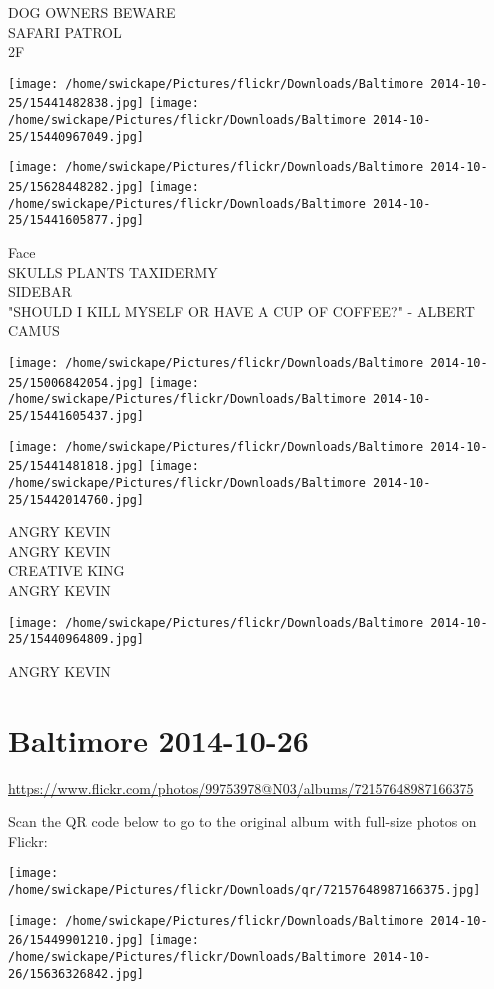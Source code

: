\documentclass[10pt,letterpaper]{article}
\begin{document}
DOG OWNERS BEWARE\\
SAFARI PATROL\\
2F
\pagebreak

\texttt{[image: /home/swickape/Pictures/flickr/Downloads/Baltimore 2014-10-25/15441482838.jpg]}
\texttt{[image: /home/swickape/Pictures/flickr/Downloads/Baltimore 2014-10-25/15440967049.jpg]}

\texttt{[image: /home/swickape/Pictures/flickr/Downloads/Baltimore 2014-10-25/15628448282.jpg]}
\texttt{[image: /home/swickape/Pictures/flickr/Downloads/Baltimore 2014-10-25/15441605877.jpg]}

Face\\
SKULLS PLANTS TAXIDERMY\\
SIDEBAR\\
"SHOULD I KILL MYSELF OR HAVE A CUP OF COFFEE?" {-} ALBERT CAMUS
\pagebreak

\texttt{[image: /home/swickape/Pictures/flickr/Downloads/Baltimore 2014-10-25/15006842054.jpg]}
\texttt{[image: /home/swickape/Pictures/flickr/Downloads/Baltimore 2014-10-25/15441605437.jpg]}

\texttt{[image: /home/swickape/Pictures/flickr/Downloads/Baltimore 2014-10-25/15441481818.jpg]}
\texttt{[image: /home/swickape/Pictures/flickr/Downloads/Baltimore 2014-10-25/15442014760.jpg]}

ANGRY KEVIN\\
ANGRY KEVIN\\
CREATIVE KING\\
ANGRY KEVIN
\pagebreak

\texttt{[image: /home/swickape/Pictures/flickr/Downloads/Baltimore 2014-10-25/15440964809.jpg]}

ANGRY KEVIN
\pagebreak

\section*{Baltimore 2014-10-26}

\url{https://www.flickr.com/photos/99753978@N03/albums/72157648987166375}

Scan the QR code below to go to the original album with full-size photos on Flickr:

\texttt{[image: /home/swickape/Pictures/flickr/Downloads/qr/72157648987166375.jpg]}
\pagebreak

\texttt{[image: /home/swickape/Pictures/flickr/Downloads/Baltimore 2014-10-26/15449901210.jpg]}
\texttt{[image: /home/swickape/Pictures/flickr/Downloads/Baltimore 2014-10-26/15636326842.jpg]}
\end{document}
